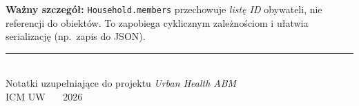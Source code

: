 \documentclass[11pt,a4paper]{article}
\begin{document}
\textbf{Ważny szczegół:} \texttt{Household.members} przechowuje \emph{listę ID} obywateli, nie referencji do obiektów. To zapobiega cyklicznym zależnościom i ułatwia serializację (np.\ zapis do JSON).

\vfill
\begin{center}
\color{muted}\small
\rule{0.4\textwidth}{0.4pt}\\[8pt]
Notatki uzupełniające do projektu \emph{Urban Health ABM}\\
ICM UW \ \textbar\ \ 2026
\end{center}
\end{document}
